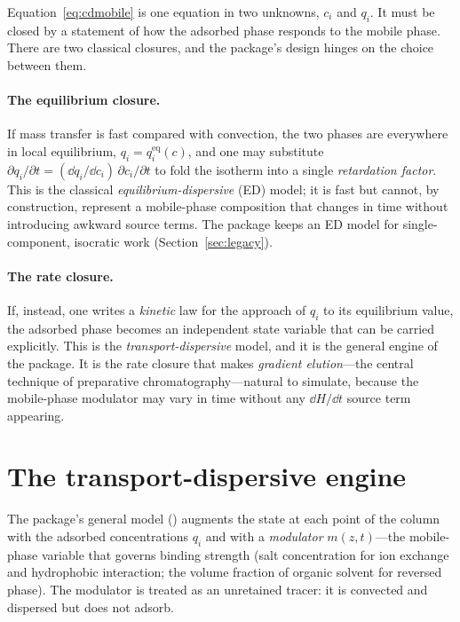 Equation~\eqref{eq:cdmobile} is one equation in two unknowns, $c_i$ and $q_i$.
It must be closed by a statement of how the adsorbed phase responds to the
mobile phase. There are two classical closures, and the package's design hinges
on the choice between them.

\paragraph{The equilibrium closure.}
If mass transfer is fast compared with convection, the two phases are everywhere
in local equilibrium, $q_i = q_i^{\mathrm{eq}}(c)$, and one may substitute
$\partial q_i/\partial t = (\dd q_i/\dd c_i)\,\partial c_i/\partial t$ to fold the
isotherm into a single \emph{retardation factor}. This is the classical
\emph{equilibrium-dispersive} (ED) model; it is fast but cannot, by
construction, represent a mobile-phase composition that changes in time without
introducing awkward source terms. The package keeps an ED model for
single-component, isocratic work (Section~\ref{sec:legacy}).

\paragraph{The rate closure.}
If, instead, one writes a \emph{kinetic} law for the approach of $q_i$ to its
equilibrium value, the adsorbed phase becomes an independent state variable that
can be carried explicitly. This is the \emph{transport-dispersive} model, and it
is the general engine of the package. It is the rate closure that makes
\emph{gradient elution}---the central technique of preparative
chromatography---natural to simulate, because the mobile-phase modulator may
vary in time without any $\dd H/\dd t$ source term appearing.

\section{The transport-dispersive engine}
\label{sec:engine}

The package's general model () augments the
state at each point of the column with the adsorbed concentrations $q_i$ and with
a \emph{modulator} $m(z,t)$---the mobile-phase variable that governs binding
strength (salt concentration for ion exchange and hydrophobic interaction; the
volume fraction of organic solvent for reversed phase). The modulator is treated
as an unretained tracer: it is convected and dispersed but does not adsorb.

